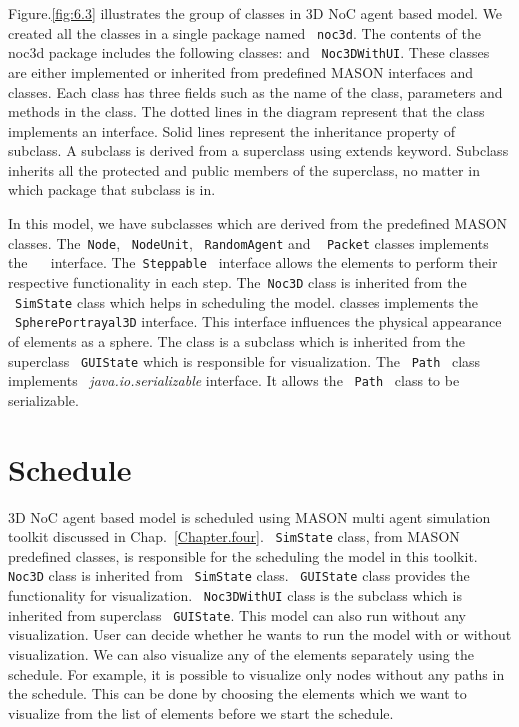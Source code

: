 Figure.\ref{fig:6.3} illustrates the group of classes in 3D NoC agent based model. We created all the classes in a single package named ~\texttt{noc3d}. The contents of the noc3d package includes the following classes: \texttt{} and \texttt{~Noc3DWithUI}. These classes are either implemented or inherited from predefined MASON interfaces and classes. Each class has three fields such as the name of the class, parameters and methods in the class. The dotted lines in the diagram represent that the class implements an interface. Solid lines represent the inheritance property of subclass. A subclass is derived from a superclass using extends keyword. Subclass inherits all the protected and public members of the superclass, no matter in which package that subclass is in.

In this model, we have subclasses which are derived from the predefined MASON classes. The~\texttt{Node},~ \texttt{NodeUnit},~ \texttt{RandomAgent} and ~ \texttt{Packet} classes implements the ~\texttt{} ~interface. The~\texttt{Steppable} ~interface allows the elements to perform their respective functionality in each step. The~\texttt{Noc3D} class is inherited from the ~\texttt{SimState} class which helps in scheduling the model. \texttt{} classes implements the ~\texttt{SpherePortrayal3D} interface. This interface influences the physical appearance of elements as a sphere. The \texttt{} class is a subclass which is inherited from the superclass ~\texttt{GUIState} which is responsible for visualization. The ~\texttt{Path} ~class implements~ \textit{java.io.serializable} interface. It allows the~ \texttt{Path} ~class to be serializable. 

\section{Schedule}
\vspace{5mm}
3D NoC agent based model is scheduled using MASON multi agent simulation toolkit discussed in Chap.~\ref{Chapter.four}.~ \texttt{SimState} class, from MASON predefined classes, is responsible for the scheduling the model in this toolkit.~ \texttt{Noc3D} class is inherited from~ \texttt{SimState} class.~ \texttt{GUIState} class provides the functionality for visualization.~ \texttt{Noc3DWithUI} class is the subclass which is inherited from superclass~ \texttt{GUIState}. This model can also run without any visualization. User can decide whether he wants to run the model with or without visualization. We can also visualize any of the elements separately using the schedule. For example, it is possible to visualize only nodes without any paths in the schedule. This can be done by choosing the elements which we want to visualize from the list of elements before we start the schedule.

